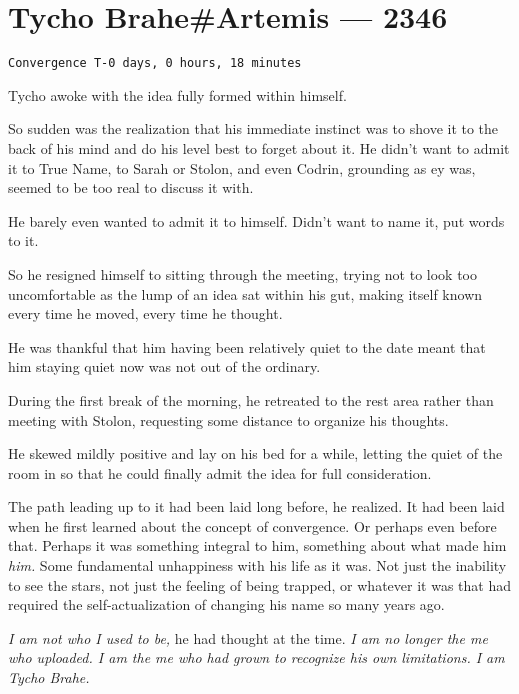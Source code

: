 \hypertarget{tycho-braheartemis-2346}{%
\chapter{Tycho Brahe\#Artemis — 2346}\label{tycho-braheartemis-2346}}

\begin{verbatim}
Convergence T-0 days, 0 hours, 18 minutes
\end{verbatim}

Tycho awoke with the idea fully formed within himself.

So sudden was the realization that his immediate instinct was to shove it to the back of his mind and do his level best to forget about it. He didn't want to admit it to True Name, to Sarah or Stolon, and even Codrin, grounding as ey was, seemed to be too real to discuss it with.

He barely even wanted to admit it to himself. Didn't want to name it, put words to it.

So he resigned himself to sitting through the meeting, trying not to look too uncomfortable as the lump of an idea sat within his gut, making itself known every time he moved, every time he thought.

He was thankful that him having been relatively quiet to the date meant that him staying quiet now was not out of the ordinary.

During the first break of the morning, he retreated to the rest area rather than meeting with Stolon, requesting some distance to organize his thoughts.

He skewed mildly positive and lay on his bed for a while, letting the quiet of the room in so that he could finally admit the idea for full consideration.

The path leading up to it had been laid long before, he realized. It had been laid when he first learned about the concept of convergence. Or perhaps even before that. Perhaps it was something integral to him, something about what made him \emph{him.} Some fundamental unhappiness with his life as it was. Not just the inability to see the stars, not just the feeling of being trapped, or whatever it was that had required the self-actualization of changing his name so many years ago.

\emph{I am not who I used to be,} he had thought at the time. \emph{I am no longer the me who uploaded. I am the me who had grown to recognize his own limitations. I am Tycho Brahe.}

